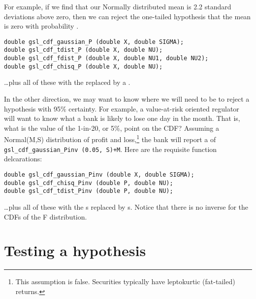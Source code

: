 For example, if we find that our Normally distributed mean is 2.2 standard
deviations above zero, then we can reject the one-tailed hypothesis that
the mean is zero with probability .

\begin{lstlisting}
double gsl_cdf_gaussian_P (double X, double SIGMA);
double gsl_cdf_tdist_P (double X, double NU);
double gsl_cdf_fdist_P (double X, double NU1, double NU2);
double gsl_cdf_chisq_P (double X, double NU);
\end{lstlisting}
\dots plus all of these with the  replaced by a .


In the other direction, we may want to know where we will need to be to reject a hypothesis with 95\%
certainty. For example, a value-at-risk oriented regulator will want to know what a bank is likely to lose 
one day in the month. That is, what is the value of the 1-in-20, or 5\%, point on the CDF?
Assuming a Normal(M,S) distribution of profit and loss,\footnote{This assumption is false. Securities
typically have leptokurtic (fat-tailed) returns.} the bank will report a  of {\tt
gsl\_cdf\_gaussian\_Pinv (0.05, S)+M}. Here are the requisite function delcarations:
\begin{lstlisting}
double gsl_cdf_gaussian_Pinv (double X, double SIGMA);
double gsl_cdf_chisq_Pinv (double P, double NU);
double gsl_cdf_tdist_Pinv (double P, double NU);
\end{lstlisting}
\dots plus all of these with the s replaced by s.
Notice that there is no inverse for the CDFs of the F distribution.





\section{Testing a hypothesis}




